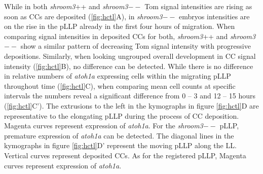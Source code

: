 \documentclass[11pt,singlespacinge,twoside]{reedthesis} %
\begin{document}
While in both \emph{shroom3}++ and \emph{shroom3}\(--\) Tom signal intensities are rising as soon as CCs are deposited (\ref{fig:hctl}A), in \emph{shroom3}\(--\) embryos intensities are on the rise in the pLLP already in the first four hours of migration. When comparing signal intensities in deposited CCs for both, \emph{shroom3}++ and \emph{shroom3}\(--\) show a similar pattern of decreasing Tom signal intensity with progressive depositions. Similarly, when looking ungrouped overall development in CC signal intensity (\ref{fig:hctl}B), no difference can be detected.
While there is no difference in relative numbers of \emph{atoh1a} expressing cells within the migrating pLLP throughout time (\ref{fig:hctl}C), when comparing mean cell counts at specific intervals the numbers reveal a significant difference from 0 -- 3 and 12 -- 15 hours (\ref{fig:hctl}C'). The extrusions to the left in the kymographs in figure \ref{fig:hctl}D are representative to the elongating pLLP during the process of CC deposition. Magenta curves represent expression of \emph{atoh1a}. For the \emph{shroom3}\(--\) pLLP, premature expression of \emph{atoh1a} can be detected. The diagonal lines in the kymographs in figure \ref{fig:hctl}D' represent the moving pLLP along the LL. Vertical curves represent deposited CCs. As for the registered pLLP, Magenta curves represent expression of \emph{atoh1a}.
\end{document}

